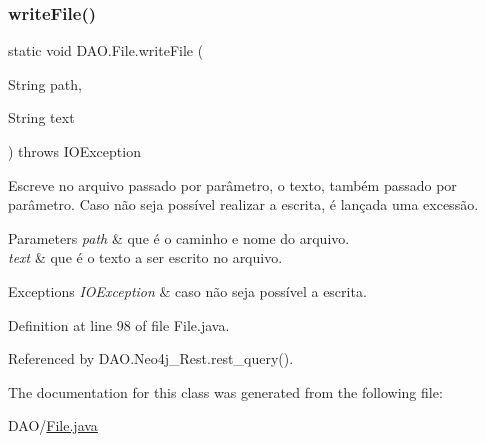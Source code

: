 \hypertarget{classDAO_1_1File_aff9e42d1f5bc8fbf1e70426585c09240}{}\label{classDAO_1_1File_aff9e42d1f5bc8fbf1e70426585c09240} 
\subsubsection{\texorpdfstring{write\+File()}{writeFile()}}
{\footnotesize\ttfamily static void D\+A\+O.\+File.\+write\+File (\begin{DoxyParamCaption}\item[{String}]{path,  }\item[{String}]{text }\end{DoxyParamCaption}) throws I\+O\+Exception\hspace{0.3cm}{\ttfamily [static]}}

Escreve no arquivo passado por parâmetro, o texto, também passado por parâmetro. Caso não seja possível realizar a escrita, é lançada uma excessão.


\begin{DoxyParams}{Parameters}
{\em path} & que é o caminho e nome do arquivo. \\
\hline
{\em text} & que é o texto a ser escrito no arquivo. \\
\hline
\end{DoxyParams}

\begin{DoxyExceptions}{Exceptions}
{\em I\+O\+Exception} & caso não seja possível a escrita. \\
\hline
\end{DoxyExceptions}


Definition at line 98 of file File.\+java.



Referenced by D\+A\+O.\+Neo4j\+\_\+\+Rest.\+rest\+\_\+query().



The documentation for this class was generated from the following file\+:\begin{DoxyCompactItemize}
\item 
D\+A\+O/\hyperlink{File_8java}{File.\+java}\end{DoxyCompactItemize}
